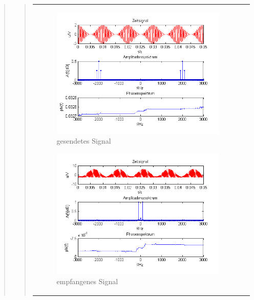 \begin{quote}
\begin{quote}
\begin{center}
\begin{tabular}{ll}
\begin{minipage}{0.6\textwidth}
                \begin{figure}[H]
                    \label{fig:DemocosinusoT}
                    \includegraphics[scale=0.7]{Bilder/Am_Cos_2k_100Hz_mo}
                    \caption{gesendetes Signal}
                \end{figure}
        
            \end{minipage}
        
            \begin{minipage}{0.6\textwidth}
                \begin{figure}[H]
                    \label{fig:DemocosinusoT2}
                    \includegraphics[scale=0.7]{Bilder/Demo_Sin_2k_100Hz_mo_ohneTiefpass}
                    \caption{empfangenes Signal}
                \end{figure}
        

\end{minipage}
\end{tabular}
\end{center}
\end{quote}
\end{quote}
